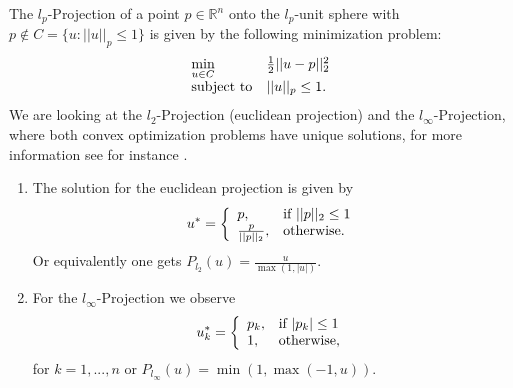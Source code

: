     \begin{example}
    \label{ex:projection_operator}

        The $l_{p}$-Projection of a point $p \in \mathbb{R}^{n}$ onto the $l_{p}$-unit sphere with $p \notin C = \{u : ||u||_{p} \le 1 \}$ is given by the following minimization problem:
            \begin{equation}
                \begin{array}{l l}
                    \min\limits_{u \in C} &  \frac{1}{2} ||u - p||_{2}^{2} \\
                    \textnormal{subject to} & ||u||_{p} \le 1.
                \end{array}
            \end{equation}
        We are looking at the $l_{2}$-Projection (euclidean projection) and the $l_{\infty}$-Projection, where both convex optimization problems have unique solutions, for more information see for instance \cite{Jitkomut Songsiri}.
        \begin{enumerate}
            \item The solution for the euclidean projection is given by
                \begin{equation}
                    u^{\ast} =
                    \left\{
                        \begin{array}{l l}
                           p, & \textnormal{if}\,\, ||p||_{2} \le 1 \\
                           \frac{p}{||p||_{2}}, & \textnormal{otherwise.}
                        \end{array}
                    \right.
                \end{equation}
            Or equivalently one gets $P_{l_{2}}(u) = \frac{u}{\max(1, |u|)}$.
            \item For the $l_{\infty}$-Projection we observe
                \begin{equation}
                    u_{k}^{\ast} =
                    \left\{
                        \begin{array}{l l}
                           p_{k}, & \textnormal{if}\,\, |p_{k}| \le 1 \\
                           1, & \textnormal{otherwise,}
                        \end{array}
                    \right.
                \end{equation}
            for $k = 1, ..., n$ or $P_{l_{\infty}}(u) = \min(1, \max(-1, u))$.
        \end{enumerate}

    \end{example}

